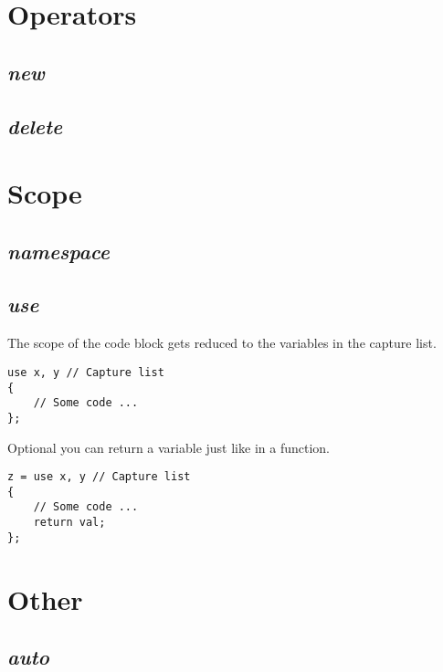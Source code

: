 \documentclass[10pt,a4paper]{article}
\begin{document}
\section{Operators}


\subsection{\textit{new}}


\subsection{\textit{delete}}




\section{Scope}


\subsection{\textit{namespace}}


\subsection{\textit{use}}
The scope of the code block gets reduced to the variables in the capture list.
\begin{lstlisting}
use x, y // Capture list
{
	// Some code ...
};
\end{lstlisting}
Optional you can return a variable just like in a function.
\begin{lstlisting}
z = use x, y // Capture list
{
	// Some code ...
	return val;
};
\end{lstlisting}




\section{Other}


\subsection{\textit{auto}}
\end{document}
